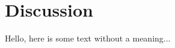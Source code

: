 \documentclass[../main.tex]{subfiles}
\begin{document}
\section{Discussion}
Hello, here is some text without a meaning...


\end{document}
